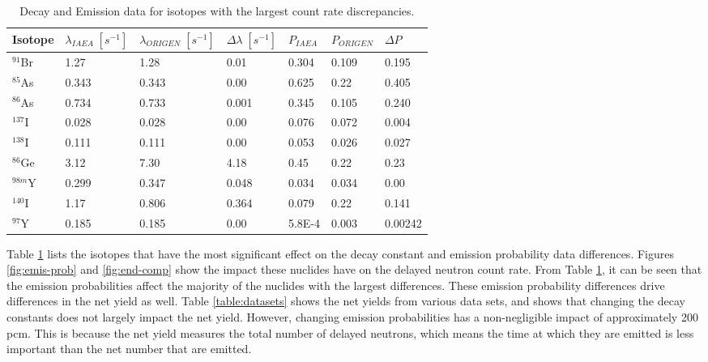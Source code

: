 \documentclass{style/nseJournal}
\begin{document}
\begin{table}[]
\centering
\caption{Decay and Emission data for isotopes with the largest count rate discrepancies.}
\begin{tabular}{|l l l l l l l|} 
 \hline
 Isotope & $\lambda_{IAEA} \; [s^{-1}]$ & $\lambda_{ORIGEN} \; [s^{-1}]$ & $\Delta \lambda \; [s^{-1}]$ & $P_{IAEA}$ & $P_{ORIGEN}$ & $\Delta P$\\
 \hline\hline
     $^{91}$Br & 1.27 & 1.28 & 0.01 & 0.304 & 0.109 & 0.195\\
     $^{85}$As & 0.343 & 0.343 & 0.00 &  0.625 & 0.22 & 0.405\\
     $^{86}$As & 0.734 & 0.733 & 0.001& 0.345 & 0.105 & 0.240\\
     $^{137}$I & 0.028 & 0.028 & 0.00 & 0.076 & 0.072 & 0.004 \\
     $^{138}$I & 0.111 & 0.111 & 0.00 & 0.053 & 0.026 & 0.027 \\
     $^{86}$Ge & 3.12 & 7.30 & 4.18 & 0.45 & 0.22 & 0.23\\
     $^{98m}$Y & 0.299 & 0.347 & 0.048 & 0.034 & 0.034 & 0.00\\
     $^{140}$I & 1.17 & 0.806 & 0.364 & 0.079 & 0.22 & 0.141\\
     $^{97}$Y & 0.185 & 0.185 & 0.00 & 5.8E-4 & 0.003 & 0.00242\\
 \hline
\end{tabular}
\label{table:worst-isos}
\end{table}

Table \ref{table:worst-isos} lists the isotopes that have the most significant effect on the decay constant and emission probability data differences.
Figures \ref{fig:emis-prob} and \ref{fig:end-comp} show the impact these nuclides have on the delayed neutron count rate. 
From Table \ref{table:worst-isos}, it can be seen that the emission probabilities affect the majority of the nuclides with the largest differences.
These emission probability differences drive differences in the net yield as well.
Table \ref{table:datasets} shows the net yields from various data sets, and shows that changing the decay constants does not largely impact the net yield.
However, changing emission probabilities has a non-negligible impact of approximately 200 pcm.
This is because the net yield measures the total number of delayed neutrons, which means the time at which they are emitted is less important than the net number that are emitted.
\end{document}

